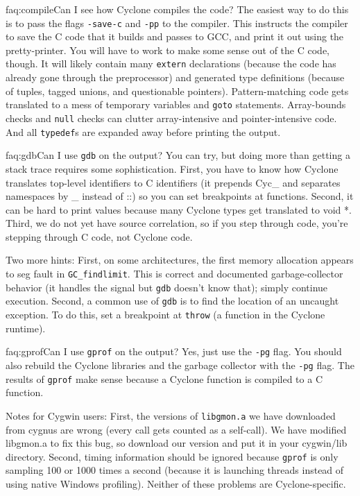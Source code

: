 \begin{faqa}{faq:compile}{Can I see how Cyclone compiles the code?}
The easiest way to do this is to pass the flags \texttt{-save-c} and
\texttt{-pp} to the compiler.  This instructs the compiler to save the
C code that it builds and passes to GCC, and print it out using the
pretty-printer.  You will have to work to make some sense out of the C
code, though.  It will likely contain many \texttt{extern}
declarations (because the code has already gone through the
preprocessor) and generated type definitions (because of tuples,
tagged unions, and questionable pointers).  Pattern-matching code gets
translated to a mess of temporary variables and \texttt{goto}
statements.  Array-bounds checks and \texttt{null} checks can clutter
array-intensive and pointer-intensive code.  And all \texttt{typedef}s
are expanded away before printing the output.
\end{faqa}

\begin{faqa}{faq:gdb}{Can I use \texttt{gdb} on the output?}
You can try, but doing more than getting a stack trace requires some
sophistication.  First, you have to know how Cyclone translates
top-level identifiers to C identifiers (it prepends Cyc_ and separates
namespaces by _ instead of ::) so you can set breakpoints at
functions.  Second, it can be hard to print values because many
Cyclone types get translated to void *.  Third, we do not yet have
source correlation, so if you step through code, you're stepping
through C code, not Cyclone code.

Two more hints: First, on some architectures, the first memory
allocation appears to seg fault in \texttt{GC_findlimit}.  This is
correct and documented garbage-collector behavior (it handles the
signal but \texttt{gdb} doesn't know that); simply continue execution.
Second, a common use of \texttt{gdb} is to find the location of an
uncaught exception.  To do this, set a breakpoint at \texttt{throw} (a
function in the Cyclone runtime).
\end{faqa}

\begin{faqa}{faq:gprof}{Can I use \texttt{gprof} on the output?}
Yes, just use the \texttt{-pg} flag.  You should also rebuild the
Cyclone libraries and the garbage collector with the \texttt{-pg}
flag.  The results of \texttt{gprof} make sense because a Cyclone
function is compiled to a C function.

Notes for Cygwin users: First, the versions of \texttt{libgmon.a} we
have downloaded from cygnus are wrong (every call gets counted as a
self-call).  We have modified libgmon.a to fix this bug, so download
our version and put it in your cygwin/lib directory.  Second, timing
information should be ignored because \texttt{gprof} is only sampling
100 or 1000 times a second (because it is launching threads instead of
using native Windows profiling).  Neither of these problems are
Cyclone-specific.
\end{faqa}

